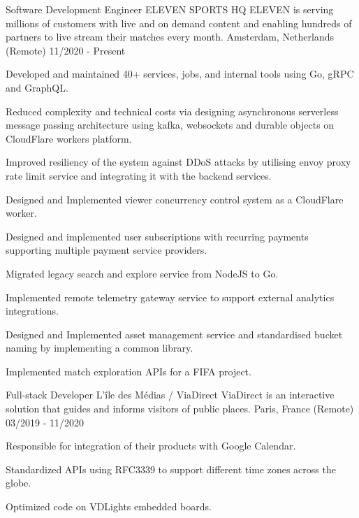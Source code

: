 
\begin{cventries}

  \cventry
    {Software Development Engineer} %
    {ELEVEN SPORTS HQ} %
    {ELEVEN is serving millions of customers with live and on demand content and enabling hundreds of partners to live stream their matches every month.}
    {Amsterdam, Netherlands (Remote)} %
    {11/2020 - Present} %
    {
      \begin{cvitems}
        \item{Developed and maintained 40+ services, jobs, and internal tools using Go, gRPC and GraphQL.}
        \item{Reduced complexity and technical costs via designing asynchronous serverless message passing architecture using kafka, websockets and durable objects on CloudFlare workers platform.}
        \item{Improved resiliency of the system against DDoS attacks by utilising envoy proxy rate limit service and integrating it with the backend services.}
        \item{Designed and Implemented viewer concurrency control system as a CloudFlare worker.}
        \item{Designed and implemented user subscriptions with recurring payments supporting multiple payment service providers.}
        \item{Migrated legacy search and explore service from NodeJS to Go.}
        \item{Implemented remote telemetry gateway service to support external analytics integrations.}
        \item{Designed and Implemented asset management service and standardised bucket naming by implementing a common library.}
        \item{Implemented match exploration APIs for a FIFA project.}
      \end{cvitems}
    }

  \cventry
    {Full-stack Developer} %
    {L'île des Médias / ViaDirect} %
    {ViaDirect is an interactive solution that guides and informs visitors of public places.}
    {Paris, France (Remote)} %
    {03/2019 - 11/2020} %
    {
      \begin{cvitems}
        \item{Responsible for integration of their products with Google Calendar.}
        \item{Standardized APIs using RFC3339 to support different time zones across the globe.}
        \item{Optimized code on VDLights embedded boards.}
      \end{cvitems}
    }


\end{cventries}
